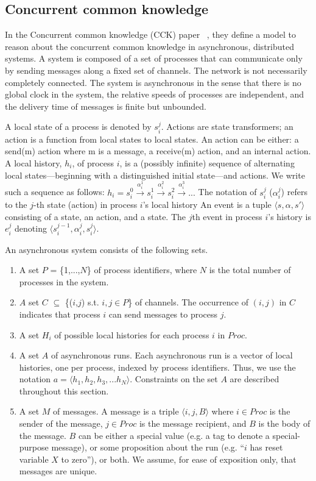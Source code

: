 \documentclass[preprint,12pt]{elsarticle}
\begin{document}
\subsection{Concurrent common knowledge}\label{se:cck}

In the Concurrent common knowledge (CCK) paper ~\cite{cck92}, they define a model to reason about the concurrent common knowledge in asynchronous, distributed systems. A system is composed of a set of processes that can communicate only by sending messages along a fixed set of channels. The network is not necessarily completely connected. The system is asynchronous in the sense that there is no global clock in the system, the relative speeds of processes are independent, and the delivery time of messages is finite but unbounded.

A local state of a process is denoted by $s^j_i$. Actions are state transformers; an action is a function from local states to local states. An action can be either: a send(m) action where m is a message, a receive(m) action, and an internal action.
	A local history, $h_i$, of process $i$, is a (possibly infinite) sequence of alternating local states—beginning with a distinguished initial state—and actions. We write such a sequence as follows: 
	$h_i = s_i^0 \xrightarrow{ \alpha_i^1 } s_i^1 \xrightarrow{\alpha_i^2} s_i^2 \xrightarrow{\alpha_i^3} ...$
The notation of $s^j_i$ ($\alpha^j_i$) refers to the $j$-th state (action) in process $i$'s local history
An event is a tuple $\langle s , \alpha, s' \rangle$ consisting of a state, an action, and a state.
The $j$th event in process $i$'s history is $e^j_i$ denoting $\langle s^{j-1}_i , \alpha^j_i, s^j_{i} \rangle$.


An asynchronous system consists of the following sets.
\begin{enumerate}
	\item A set $P$ = \{1,...,$N$\} of process identifiers, where $N$ is the total number of processes in the system.
	\item $A$ set $C$ $\subseteq$ \{($i$,$j$) s.t. $i,j \in P$\} of channels. The occurrence of $(i,j)$ in $C$ indicates that process $i$ can send messages to process $j$.
	\item A set $H_i$ of possible local histories for each process $i$ in $Proc$.
	\item A set $A$ of asynchronous runs. Each asynchronous run is a vector of local histories, one per process, indexed by process identifiers. Thus, we use the notation
	$a = \langle h_1,h_2,h_3,...h_N \rangle$.
	Constraints on the set $A$ are described throughout this section.
	\item A set $M$ of messages. A message is a triple $\langle i,j,B \rangle$ where $i \in Proc$ is the sender of the message, $j \in Proc$ is the message recipient, and $B$ is the body of the message. $B$ can be either a special value (e.g. a tag to denote a special-purpose message), or some proposition about the run (e.g. “$i$ has reset variable $X$ to zero”), or both. We assume, for ease of exposition only, that messages are unique.
\end{enumerate}
\end{document}

